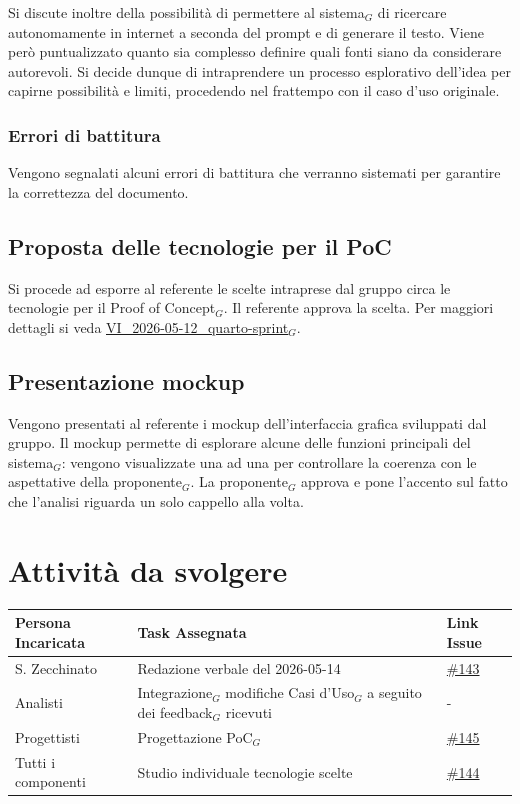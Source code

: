 \documentclass[a4paper, 10pt, colorlinks=true, linkcolor=black, urlcolor=blue, citecolor=blue, hidelinks]{article}
\newcommand{\dataverbale}{2026-05-14}
\newcommand{\issue}[1]{\href{https://github.com/thebitless-group-swe/thebitless.github.io/issues/#1}{\##1}}
\begin{document}
Si discute inoltre della possibilità di permettere al sistema$_G$ di ricercare autonomamente in internet a seconda del prompt e di generare il testo. Viene però puntualizzato quanto sia complesso definire quali fonti siano da considerare autorevoli. Si decide dunque di intraprendere un processo esplorativo dell'idea per capirne possibilità e limiti, procedendo nel frattempo con il caso d'uso originale.

\subsubsection{Errori di battitura}
Vengono segnalati alcuni errori di battitura che verranno sistemati per garantire la correttezza del documento.

\subsection{Proposta delle tecnologie per il PoC}
Si procede ad esporre al referente le scelte intraprese dal gruppo circa le tecnologie per il Proof of Concept$_G$. Il referente approva la scelta.
Per maggiori dettagli si veda \href{https://thebitless.live/RTB/doc_interna/verbali/VI_2026-05-12_quarto-sprint/VI_2026-05-12_quarto-sprint.pdf}{\underline{VI\_2026-05-12\_quarto-sprint$_G$}}.

\subsection{Presentazione mockup}
Vengono presentati al referente i mockup dell'interfaccia grafica sviluppati dal gruppo. Il mockup permette di esplorare alcune delle funzioni principali del sistema$_G$: vengono visualizzate una ad una per controllare la coerenza con le aspettative della proponente$_G$. La proponente$_G$ approva e pone l'accento sul fatto che l'analisi riguarda un solo cappello alla volta.

\section{Attività da svolgere}

\begin{center}
\renewcommand{\arraystretch}{1.4}
\begin{tabular}{|p{4.2cm}|p{6.2cm}|p{2.2cm}|}
\hline
\textbf{Persona Incaricata} & \textbf{Task Assegnata} & \centering\textbf{Link Issue} \tabularnewline
\hline
S. Zecchinato & Redazione verbale del \dataverbale & \centering \issue{143} \tabularnewline
\hline
Analisti & Integrazione$_G$ modifiche Casi d'Uso$_G$ a seguito dei feedback$_G$ ricevuti & \centering - \tabularnewline
\hline
Progettisti & Progettazione PoC$_G$ & \centering \issue{145} \tabularnewline
\hline
Tutti i componenti & Studio individuale tecnologie scelte& \centering \issue{144} \tabularnewline
\hline
\end{tabular}
\end{center}
\end{document}
